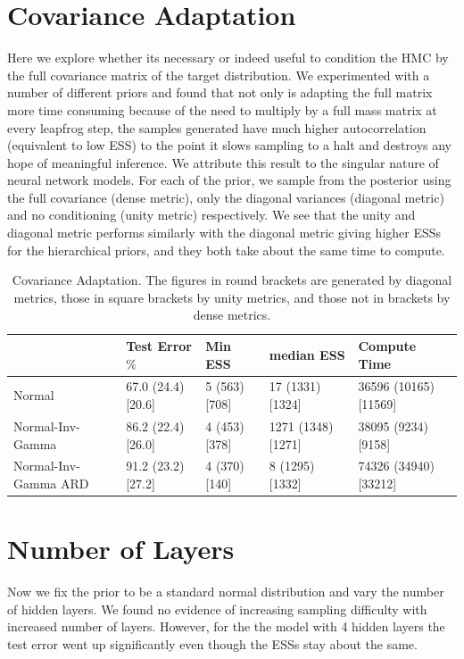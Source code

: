 \documentclass[12pt]{report}
\begin{document}
\section{Covariance Adaptation}
Here we explore whether its necessary or indeed useful to condition the HMC by the full covariance matrix of the target distribution. We experimented with a number of different priors and found that not only is adapting the full matrix more time consuming because of the need to multiply by a full mass matrix at every leapfrog step, the samples generated have much higher autocorrelation (equivalent to low ESS) to the point it slows sampling to a halt and destroys any hope of meaningful inference. We attribute this result to the singular nature of neural network models. For each of the prior, we sample from the posterior using the full covariance (dense metric), only the diagonal variances (diagonal metric) and no conditioning (unity metric) respectively. We see that the unity and diagonal metric performs similarly with the diagonal metric giving higher ESSs for the hierarchical priors, and they both take about the same time to compute.

\begin{table}[]
\footnotesize
\begin{tabular}{@{}lllll@{}}
\toprule
                     & Test Error$\%$ & Min ESS & median ESS & Compute Time \\ \midrule
Normal               & 67.0 (24.4) [20.6]   & 5 (563) [708] & 17 (1331) [1324]  & 36596 (10165) [11569]     \\ \midrule
Normal-Inv-Gamma     & 86.2 (22.4) [26.0]  & 4 (453) [378]  & 1271 (1348) [1271]    & 38095 (9234) [9158]     \\ \midrule
Normal-Inv-Gamma ARD & 91.2 (23.2) [27.2]  & 4 (370) [140]  & 8 (1295) [1332]    & 74326 (34940) [33212]     \\ \bottomrule
\end{tabular}
\caption{Covariance Adaptation. The figures in round brackets are generated by diagonal metrics, those in square brackets by unity metrics, and those not in brackets by dense metrics. }
\label{my-label}
\end{table}

\section{Number of Layers}
Now we fix the prior to be a standard normal distribution and vary the number of hidden layers. We found no evidence of increasing sampling difficulty with increased number of layers. 
However, for the the model with 4 hidden layers the test error went up significantly even though the ESSs stay about the same. 
\end{document}
